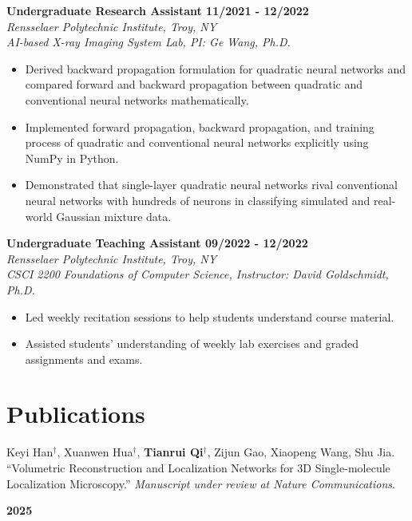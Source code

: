 \documentclass[letterpaper, 11pt]{article}
\newcommand{\subsectionvspace}{\vspace{8pt}}
\begin{document}
    \textbf{Undergraduate Research Assistant \hfill 11/2021 - 12/2022} \\
    \textit{Rensselaer Polytechnic Institute, Troy, NY} \\
    \textit{AI-based X-ray Imaging System Lab, PI: Ge Wang, Ph.D.}
    \begin{itemize}
        \item Derived backward propagation formulation for quadratic neural networks and compared forward and backward propagation between quadratic and conventional neural networks mathematically.
        \item Implemented forward propagation, backward propagation, and training process of quadratic and conventional neural networks explicitly using NumPy in Python.
        \item Demonstrated that single-layer quadratic neural networks rival conventional neural networks with hundreds of neurons in classifying simulated and real-world Gaussian mixture data.
    \end{itemize}

    \subsectionvspace

    \textbf{Undergraduate Teaching Assistant \hfill 09/2022 - 12/2022} \\
    \textit{Rensselaer Polytechnic Institute, Troy, NY} \\
    \textit{CSCI 2200 Foundations of Computer Science, Instructor: David Goldschmidt, Ph.D.}
    \begin{itemize}
        \item Led weekly recitation sessions to help students understand course material.
        \item Assisted students' understanding of weekly lab exercises and graded assignments and exams.
    \end{itemize}


\section{Publications}


    \begin{minipage}[t]{0.9\textwidth} 
        Keyi Han$^\dag$, Xuanwen Hua$^\dag$, \textbf{Tianrui Qi}$^\dag$, Zijun Gao, Xiaopeng Wang, Shu Jia. 
        ``Volumetric Reconstruction and Localization Networks for 3D Single-molecule Localization Microscopy.''
        \textit{Manuscript under review at Nature Communications}.
    \end{minipage}%
    \begin{minipage}[t]{0.1\textwidth} \raggedleft
        \textbf{2025}
    \end{minipage}
\end{document}
